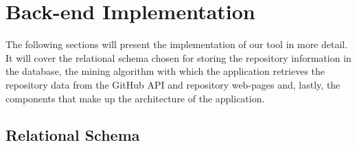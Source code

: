 \chapter{Back-end Implementation}\label{ch:4}

The following sections will present the implementation of our tool in more detail.
It will cover the relational schema chosen for storing the repository information in the database, the mining algorithm with which the application retrieves the repository data from the GitHub API and repository web-pages and, lastly, the components that make up the architecture of the application.

\section{Relational Schema}

